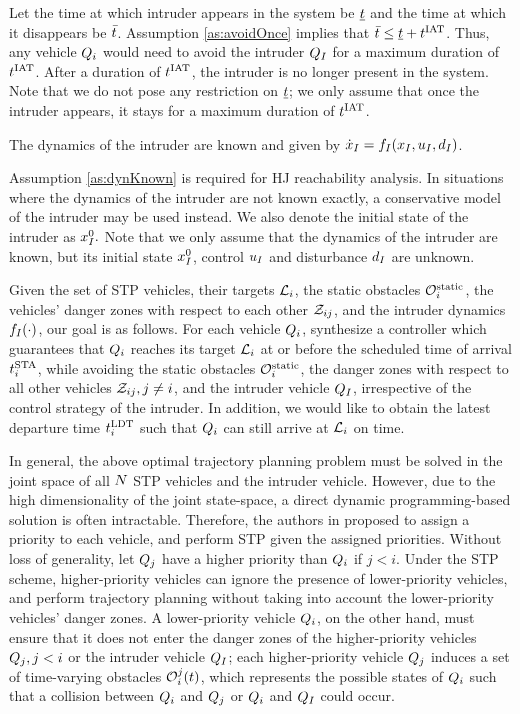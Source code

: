 Let the time at which intruder appears in the system be $\underline{t}$ and the time at which it disappears be $\bar{t}$. Assumption \ref{as:avoidOnce} implies that $\bar{t} \leq \underline{t} + t^\text{IAT}$. Thus, any vehicle $Q_i$ would need to avoid the intruder $Q_{I}$ for a maximum duration of $t^\text{IAT}$. After a duration of $t^\text{IAT}$, the intruder is no longer present in the system. Note that we do not pose any restriction on $\underline{t}$; we only assume that once the intruder appears, it stays for a maximum duration of $t^\text{IAT}$.
\begin{assumption}
\label{as:dynKnown}
The dynamics of the intruder are known and given by $\dot{x}_I = f_I(x_I, u_I, d_I)$.
\end{assumption}
Assumption \ref{as:dynKnown} is required for HJ reachability analysis. In situations where the dynamics of the intruder are not known exactly, a conservative model of the intruder may be used instead. We also denote the initial state of the intruder as $x_{I}^0.$ Note that we only assume that the dynamics of the intruder are known, but its initial state $x_{I}^0$, control $u_I$ and disturbance $d_I$ are unknown.

Given the set of STP vehicles, their targets $\mathcal{L}_i$, the static obstacles $\mathcal{O}^\text{static}_i$, the vehicles' danger zones with respect to each other $\mathcal{Z}_{ij}$, and the intruder dynamics $f_I(\cdot)$, our goal is as follows. For each vehicle $Q_i$, synthesize a controller which guarantees that $Q_i$ reaches its target $\mathcal{L}_i$ at or before the scheduled time of arrival $t^\text{STA}_i$, while avoiding the static obstacles $\mathcal{O}^\text{static}_i$, the danger zones with respect to all other vehicles $\mathcal{Z}_{ij}, j\neq i$, and the intruder vehicle $Q_{I}$, irrespective of the control strategy of the intruder. In addition, we would like to obtain the latest departure time $t^\text{LDT}_i$ such that $Q_i$ can still arrive at $\mathcal{L}_i$ on time.

In general, the above optimal trajectory planning problem must be solved in the joint space of all $N$ STP vehicles and the intruder vehicle. However, due to the high dimensionality of the joint state-space, a direct dynamic programming-based solution is often intractable. Therefore, the authors in \cite{Chen15c} proposed to assign a priority to each vehicle, and perform STP given the assigned priorities. Without loss of generality, let $Q_j$ have a higher priority than $Q_i$ if $j<i$. Under the STP scheme, higher-priority vehicles can ignore the presence of lower-priority vehicles, and perform trajectory planning without taking into account the lower-priority vehicles' danger zones. A lower-priority vehicle $Q_i$, on the other hand, must ensure that it does not enter the danger zones of the higher-priority vehicles $Q_j, j<i$ or the intruder vehicle $Q_{I}$; each higher-priority vehicle $Q_j$ induces a set of time-varying obstacles $\mathcal{O}_i^j(t)$, which represents the possible states of $Q_i$ such that a collision between $Q_i$ and $Q_j$ or $Q_i$ and $Q_{I}$ could occur.


